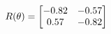 \documentclass[preview]{standalone}
\begin{document}
\begin{align*}
\special{dvisvgm:raw <g id='unique000'>}R(\theta) = \begin{bmatrix}-0.82 & -0.57\\0.57 & -0.82\end{bmatrix}\special{dvisvgm:raw </g>}
\end{align*}
\end{document}
